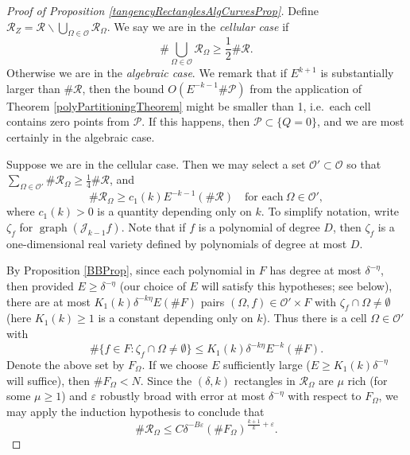 \documentclass[letterpaper, reqno,11pt]{article}
\numberwithin{equation}{section}
\newcommand{\eps}{\varepsilon}
\numberwithin{thm}{section}
\theoremstyle{remark}
\begin{document}
\begin{proof}[Proof of Proposition \ref{tangencyRectanglesAlgCurvesProp}]
Define $\mathcal{R}_Z=\mathcal{R}\backslash\bigcup_{\Omega\in \mathcal{O} }\mathcal{R}_{\Omega}$. We say we are in the \emph{cellular case} if 
\[
\#\bigcup_{\Omega\in \mathcal{O}}\mathcal{R}_\Omega \geq \frac{1}{2}\#\mathcal{R}.
\] 
Otherwise we are in the \emph{algebraic case}. We remark that if $E^{k+1}$ is substantially larger than $\#\mathcal{R}$, then the bound $O(E^{-k-1}\#\mathcal{P})$ from the application of Theorem \ref{polyPartitioningTheorem} might be smaller than 1, i.e.~each cell contains zero points from $\mathcal{P}$. If this happens, then $\mathcal{P}\subset \{Q=0\}$, and we are most certainly in the algebraic case. 

\medskip

Suppose we are in the cellular case. Then we may select a set $\mathcal{O}'\subset \mathcal{O}$ so that $\sum_{\Omega\in \mathcal{O}'}\#\mathcal{R}_{\Omega} \geq \frac{1}{4}\#\mathcal{R}$, and 
\begin{equation}\label{eachCellManyRectangles}
\#\mathcal{R}_{\Omega}\geq c_1(k) E^{-k-1}(\#\mathcal{R})\quad\textrm{for each}\ \Omega\in \mathcal{O}',
\end{equation} 
where $c_1(k)>0$ is a quantity depending only on $k$. To simplify notation, write $\zeta_f$ for $\operatorname{graph}(\mathcal{J}_{k-1}f)$. Note that if $f$ is a polynomial of degree $D$, then $\zeta_f$ is a one-dimensional real variety defined by polynomials of degree at most $D$.

By Proposition \ref{BBProp}, since each polynomial in $F$ has degree at most $\delta^{-\eta}$, then provided $E\geq\delta^{-\eta}$ (our choice of $E$ will satisfy this hypotheses; see below), there are at most $K_1(k) \delta^{-k\eta} E(\# F)$ pairs $(\Omega, f)\in\mathcal{O}'\times F$ with $\zeta_f\cap \Omega\neq\emptyset$ (here $K_1(k)\geq 1$ is a constant depending only on $k$). Thus there is a cell $\Omega \in\mathcal{O}'$ with 
\begin{equation}\label{numberOfGInteractingF}
\#\{f\in F \colon \zeta_f\cap \Omega \neq\emptyset\}\leq K_1(k) \delta^{-k\eta} E^{-k}(\#F).
\end{equation}
Denote the above set by $F_\Omega$. If we choose $E$ sufficiently large ($E \geq K_1(k)\delta^{-\eta}$ will suffice), then  $\#F_\Omega<N$. Since the $(\delta,k)$ rectangles in $\mathcal{R}_\Omega$ are $\mu$ rich (for some $\mu\geq 1$) and $\eps$ robustly broad with error at most $\delta^{-\eta}$ with respect to $F_{\Omega}$, we may apply the induction hypothesis to conclude that
\begin{equation}\label{inductionHypothesisOnRO}
\#\mathcal{R}_\Omega \leq C  \delta^{-B\eps}(\# F_\Omega)^{\frac{k+1}{k}+\eps}.
\end{equation}


\end{proof}
\end{document}
